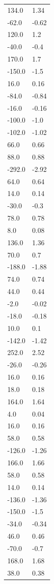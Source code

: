 \begin{longtable}{ll}
134.0 & 1.34 \\
-62.0 & -0.62 \\
120.0 & 1.2 \\
-40.0 & -0.4 \\
170.0 & 1.7 \\
-150.0 & -1.5 \\
16.0 & 0.16 \\
-84.0 & -0.84 \\
-16.0 & -0.16 \\
-100.0 & -1.0 \\
-102.0 & -1.02 \\
66.0 & 0.66 \\
88.0 & 0.88 \\
-292.0 & -2.92 \\
64.0 & 0.64 \\
14.0 & 0.14 \\
-30.0 & -0.3 \\
78.0 & 0.78 \\
8.0 & 0.08 \\
136.0 & 1.36 \\
70.0 & 0.7 \\
-188.0 & -1.88 \\
74.0 & 0.74 \\
44.0 & 0.44 \\
-2.0 & -0.02 \\
-18.0 & -0.18 \\
10.0 & 0.1 \\
-142.0 & -1.42 \\
252.0 & 2.52 \\
-26.0 & -0.26 \\
16.0 & 0.16 \\
18.0 & 0.18 \\
164.0 & 1.64 \\
4.0 & 0.04 \\
16.0 & 0.16 \\
58.0 & 0.58 \\
-126.0 & -1.26 \\
166.0 & 1.66 \\
58.0 & 0.58 \\
14.0 & 0.14 \\
-136.0 & -1.36 \\
-150.0 & -1.5 \\
-34.0 & -0.34 \\
46.0 & 0.46 \\
-70.0 & -0.7 \\
168.0 & 1.68 \\
38.0 & 0.38 \\

\end{longtable}
